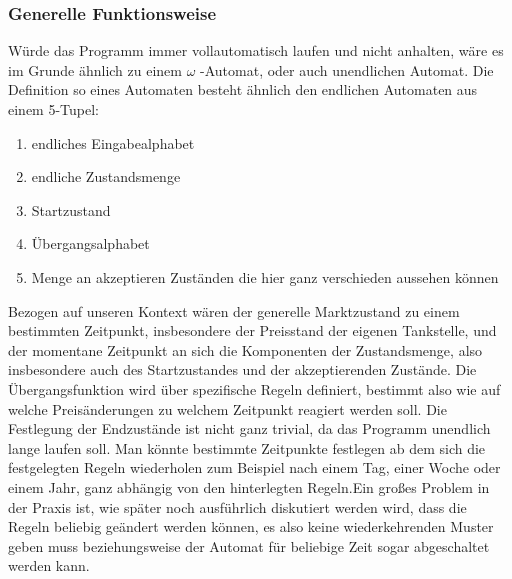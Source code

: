 \documentclass[12pt,a4paper,bibliography=totocnumbered,listof=totocnumbered]{scrartcl}
\begin{document}
\subsubsection{Generelle Funktionsweise}
Würde das Programm immer vollautomatisch laufen und nicht anhalten, wäre es im Grunde ähnlich zu einem $\omega$ -Automat, oder auch unendlichen Automat. Die Definition so eines Automaten besteht ähnlich den endlichen Automaten aus einem 5-Tupel:
\begin{enumerate}
\item endliches Eingabealphabet
\item endliche Zustandsmenge
\item Startzustand
\item Übergangsalphabet
\item Menge an akzeptieren Zuständen die hier ganz verschieden aussehen können
\end{enumerate}

Bezogen auf unseren Kontext wären der generelle Marktzustand zu einem bestimmten Zeitpunkt, insbesondere der Preisstand der eigenen Tankstelle, und der momentane Zeitpunkt an sich die Komponenten der Zustandsmenge, also insbesondere auch des Startzustandes und der akzeptierenden Zustände.
Die Übergangsfunktion wird über spezifische Regeln definiert, bestimmt also wie auf welche Preisänderungen zu welchem Zeitpunkt reagiert werden soll. Die Festlegung der Endzustände ist nicht ganz trivial, da das Programm unendlich lange laufen soll. Man könnte bestimmte Zeitpunkte festlegen ab dem sich die festgelegten Regeln wiederholen zum Beispiel nach einem Tag, einer Woche oder einem Jahr, ganz abhängig von den hinterlegten Regeln.Ein großes Problem in der Praxis ist, wie später noch ausführlich diskutiert werden wird, dass die Regeln beliebig geändert werden können, es also keine wiederkehrenden Muster geben muss beziehungsweise der Automat für beliebige Zeit sogar abgeschaltet werden kann.

\end{document}
